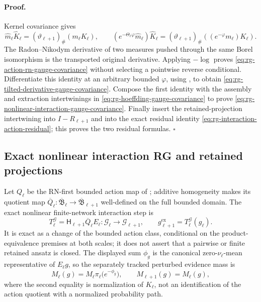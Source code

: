 \paragraph{Proof.}
Kernel covariance gives
\[
 \widehat m_\ell\widehat K_\ell
 =(\vartheta_{\ell+1})_\#(m_\ell K_\ell),\qquad
 (e^{-\Theta_\ell\varphi}\widehat m_\ell)\widehat K_\ell
 =(\vartheta_{\ell+1})_\#((e^{-\varphi}m_\ell)K_\ell).
\]
The Radon--Nikodym derivative of two measures pushed through the same Borel
isomorphism is the transported original derivative.  Applying \(-\log\)
proves \eqref{eq:rg-action-rn-gauge-covariance} without selecting a
pointwise reverse conditional.  Differentiate this identity at an arbitrary
bounded \(\varphi\), using
, to obtain
\eqref{eq:rg-tilted-derivative-gauge-covariance}.  Compose the first identity
with the assembly and extraction intertwinings in
\eqref{eq:rg-hoeffding-gauge-covariance} to prove
\eqref{eq:rg-nonlinear-interaction-gauge-covariance}.  Finally insert the
retained-projection intertwining into \(I-R_{\ell+1}\) and into the exact
residual identity \eqref{eq:rg-interaction-action-residual}; this proves the
two residual formulas. \(\square\)

\subsection{Exact nonlinear interaction RG and retained projections}
\label{sec:rg-exact-nonlinear-interaction-rg}

Let \(Q_\ell\) be the RN-first bounded action map of
; additive homogeneity makes its quotient
map \(\overline Q_\ell:\overline{\mathfrak B}_\ell\to
\overline{\mathfrak B}_{\ell+1}\) well-defined on the full bounded domain.
The exact nonlinear finite-network interaction step is
\begin{equation}
 T_\ell^{\mathcal G}
 =\mathsf H_{\ell+1}\overline Q_\ell E_\ell:
 \mathcal G_\ell\longrightarrow\mathcal G_{\ell+1},
 \qquad
 g_{\ell+1}^{\mathrm{ex}}=T_\ell^{\mathcal G}(g_\ell).
 \label{eq:rg-exact-nonlinear-interaction-map}
\end{equation}
It is exact as a change of the bounded action class, conditional on the
product-equivalence premises at both scales; it does not assert that a
pairwise or finite retained ansatz is closed.  The displayed sum
\(\phi_g\) is the canonical zero-\(\nu_\ell\)-mean representative of
\(E_\ell g\), so the separately tracked perturbed evidence mass is
\begin{equation}
 M_\ell(g)=M_\ell \pi_\ell\bigl(e^{-\phi_g}\bigr),
 \qquad M_{\ell+1}(g)=M_\ell(g),
 \label{eq:rg-interaction-evidence-mass}
\end{equation}
where the second equality is normalization of \(K_\ell\), not an
identification of the action quotient with a normalized probability path.

